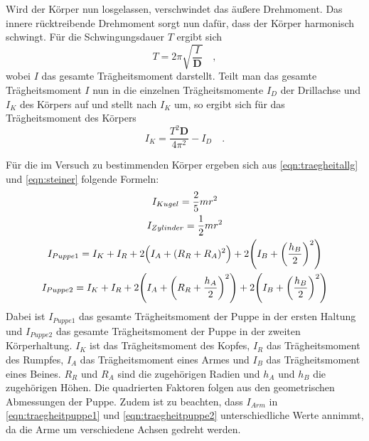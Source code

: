 Wird der Körper nun losgelassen, verschwindet das äußere Drehmoment. Das innere
rücktreibende Drehmoment sorgt nun dafür, dass der Körper harmonisch schwingt.
Für die Schwingungsdauer $T$ ergibt sich
\begin{equation}
  T=2\pi\sqrt{\frac{I}{\symbf{D}}}\quad,
  \label{eqn:schwingung}
\end{equation}
wobei $I$ das gesamte Trägheitsmoment darstellt. Teilt man das gesamte Trägheitsmoment
$I$ nun in die einzelnen Trägheitsmomente $I_D$ der Drillachse und
$I_K$ des Körpers auf und stellt nach $I_K$ um, so ergibt sich für
das Trägheitsmoment des Körpers
\begin{equation}
  I_K=\frac{T^2 \symbf{D}}{4\pi^2}-I_D\quad.
  \label{eqn:traegheitschwingung}
\end{equation}

Für die im Versuch zu bestimmenden Körper ergeben sich aus \eqref{eqn:traegheitallg}
und \eqref{eqn:steiner} folgende Formeln:
\begin{gather}
  I_{Kugel}=\frac{2}{5}mr^2
  \label{eqn:traegheitkugel} \\
  I_{Zylinder}=\frac{1}{2}mr^2
  \label{eqn:traegheitzylinder} \\
  \begin{split}
    I_{Puppe1}=I_{K}+I_{R}
    +2\Bigl(I_{A}+(R_{R}+R_{A})^2\Bigr)
    +2\Biggl(I_{B}+\biggl(\frac{h_{B}}{2}\biggr)^2\Biggr)
    \label{eqn:traegheitpuppe1}
  \end{split}
  \\
  \begin{split}
    I_{Puppe2}=I_{K}+I_{R}
    +2\Biggl(I_{A}+\biggl(R_{R}+\frac{h_{A}}{2}\biggr)^2\Biggr)
    +2\Biggl(I_{B}+\biggl(\frac{h_{B}}{2}\biggr)^2\Biggr)
    \label{eqn:traegheitpuppe2}
  \end{split}
\end{gather}
Dabei ist $I_{Puppe1}$ das gesamte Trägheitsmoment der Puppe in der ersten
Haltung und $I_{Puppe2}$ das gesamte Trägheitsmoment der Puppe in der
zweiten Körperhaltung. $I_{K}$ ist das Trägheitsmoment des Kopfes, $I_{R}$
das Trägheitsmoment des Rumpfes, $I_{A}$ das Trägheitsmoment eines Armes und
$I_{B}$ das Trägheitsmoment eines Beines. $R_R$ und $R_A$ sind die zugehörigen
Radien und $h_A$ und $h_B$ die zugehörigen Höhen. Die quadrierten Faktoren folgen
aus den geometrischen Abmessungen der Puppe. Zudem ist zu beachten, dass $I_{Arm}$
in \eqref{eqn:traegheitpuppe1} und \eqref{eqn:traegheitpuppe2} unterschiedliche Werte
annimmt, da die Arme um verschiedene Achsen gedreht werden.
